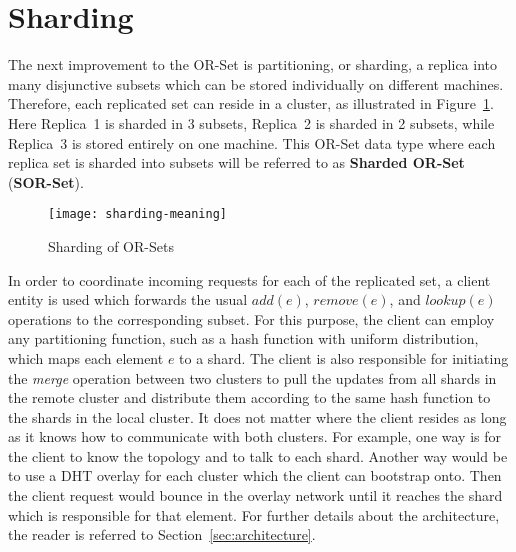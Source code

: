 \section{Sharding}
\label{sec:sharding}

The next improvement to the OR-Set is partitioning, or sharding, a replica into
many disjunctive subsets which can be stored individually on different machines.
Therefore, each replicated set can reside in a cluster, as illustrated in
Figure~\ref{fig:sharding_meaning}. Here Replica~1 is sharded in 3 subsets,
Replica~2 is sharded in 2 subsets, while Replica~3 is stored entirely on one
machine. This OR-Set data type where each replica set is sharded into subsets
will be referred to as \textbf{Sharded OR-Set} (\textbf{SOR-Set}).

\begin{figure}[b]
  \centering
  \begin{minipage}{1\linewidth}
    \centering
    \texttt{[image: sharding-meaning]}
    \caption{Sharding of OR-Sets}
    \label{fig:sharding_meaning}
  \end{minipage}
\end{figure}

In order to coordinate incoming requests for each of the replicated set, a
client entity is used which forwards the usual $\textit{add}(e)$,
$\textit{remove}(e)$, and $\textit{lookup}(e)$ operations to the corresponding
subset. For this purpose, the client can employ any partitioning function, such
as a hash function with uniform distribution, which maps each element $e$ to a
shard. The client is also responsible for initiating the \textit{merge}
operation between two clusters to pull the updates from all shards in the remote
cluster and distribute them according to the same hash function to the shards in
the local cluster. It does not matter where the client resides as long as it
knows how to communicate with both clusters. For example, one way is for the
client to know the topology and to talk to each shard. Another way would be to
use a DHT overlay for each cluster which the client can bootstrap onto. Then the
client request would bounce in the overlay network until it reaches the shard
which is responsible for that element. For further details about the
architecture, the reader is referred to Section~\ref{sec:architecture}.

